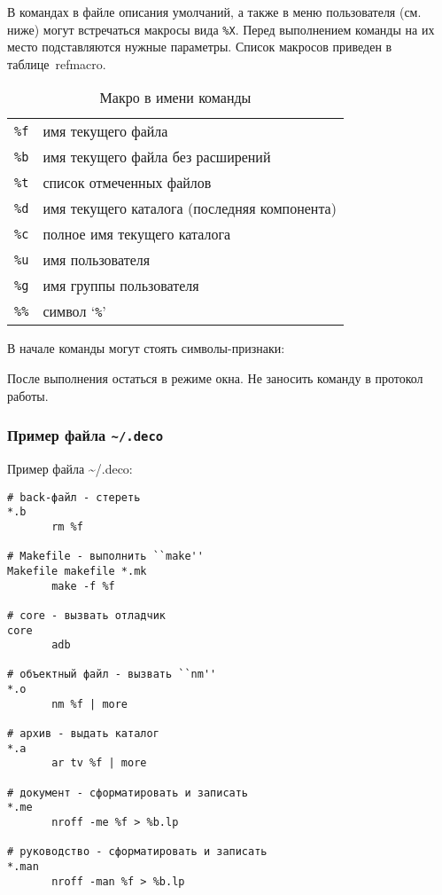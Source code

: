 В командах в файле описания умолчаний, а также в меню пользователя
(см. ниже) могут встречаться макросы вида {\tt \%X}. Перед выполнением
команды на их место подставляются нужные параметры. Список макросов
приведен в таблице~ref{macro}.

\begin{table}[bp]
\begin{center}
\begin{tabular}{|cl|}
\hline
{\tt \%f} & имя текущего файла \\
{\tt \%b} & имя текущего файла без расширений \\
{\tt \%t} & список отмеченных файлов \\
{\tt \%d} & имя текущего каталога (последняя компонента) \\
{\tt \%c} & полное имя текущего каталога \\
{\tt \%u} & имя пользователя \\
{\tt \%g} & имя группы пользователя \\
{\tt \%\%} & символ `{\tt \%}' \\
\hline
\end{tabular}
\caption{Макро в имени команды}
\label{macro}
\end{center}
\end{table}

В начале команды могут стоять символы-признаки:

\begin{example}
\litem{{\tt -}}
После выполнения остаться в режиме окна.
Не заносить команду в протокол работы.
\end{example}

\subsubsection{Пример файла {\tt \~{}/.deco}}

Пример файла \~{}/.deco:
\begin{source}
\begin{verbatim}
# back-файл - стереть
*.b
       rm %f

# Makefile - выполнить ``make''
Makefile makefile *.mk
       make -f %f

# core - вызвать отладчик
core
       adb

# объектный файл - вызвать ``nm''
*.o
       nm %f | more

# архив - выдать каталог
*.a
       ar tv %f | more

# документ - сформатировать и записать
*.me
       nroff -me %f > %b.lp

# руководство - сформатировать и записать
*.man
       nroff -man %f > %b.lp
\end{verbatim}
\end{source}

